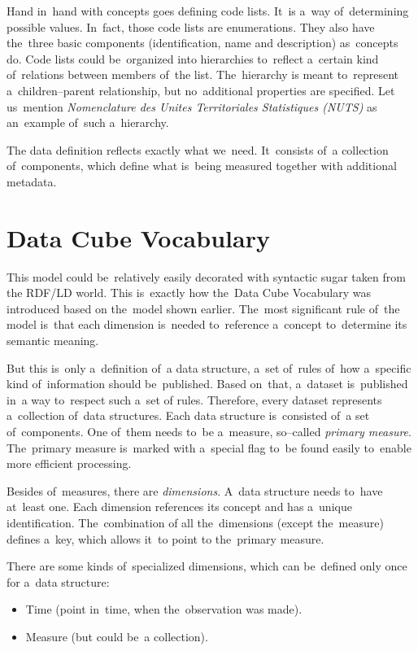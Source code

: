 \label{SDMX-code-lists}
Hand in~hand with concepts goes defining code lists. It~is a~way of~determining possible
values. In~fact, those code lists are enumerations. They also have the~three basic components
(identification, name and description) as~concepts do. Code lists could be~organized into
hierarchies to~reflect a~certain kind of~relations between members of~the list. The~hierarchy
is meant to~represent a~children--parent relationship, but no~additional properties are specified.
Let us~mention \emph{Nomenclature des Unites Territoriales Statistiques (NUTS)} 
as an~example of~such a~hierarchy.

The data definition reflects exactly what we~need. It~consists of~a collection of~components, which define what is~being measured together with additional metadata.

\section{Data Cube Vocabulary}
\label{datacube-vocabulary}

This model could be~relatively easily decorated with syntactic sugar taken from the
RDF/LD world. This is~exactly how the~Data Cube Vocabulary was introduced based
on the~model shown earlier. The~most significant rule of~the model is~that each
dimension is~needed to~reference a~concept to~determine its semantic meaning.

But this is~only a~definition of~a data structure, a~set of~rules of~how a~specific kind of~information
should be~published. Based on~that, a~dataset is~published in~a way to~respect such a~set
of rules. Therefore, every dataset represents a~collection of~data structures. Each data
structure is~consisted of~a set of~components. One of~them needs to~be a~measure,
so--called \emph{primary measure}. The~primary measure is~marked with a~special flag to~be found
easily to~enable more efficient processing.

Besides of~measures, there are \emph{dimensions}. A~data structure needs to~have at~least one.
Each dimension references its concept and has a~unique identification. The~combination of
all the~dimensions (except the~measure) defines a~key, which allows it~to point
to the~primary measure.

There are some kinds of~specialized dimensions, which can be~defined only once
for a~data structure:

\begin{itemize}
\item Time (point in~time, when the~observation was made).
\item Measure (but could be~a collection).
\end{itemize}

